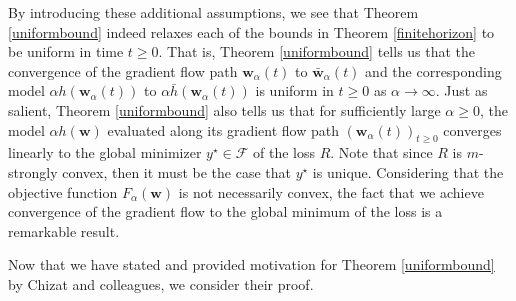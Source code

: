 \documentclass{article}
\begin{document}
By introducing these additional assumptions, we see that Theorem \ref{uniformbound} indeed relaxes each of the bounds in Theorem \ref{finitehorizon} to be uniform in time $t \geq 0$. That is, Theorem \ref{uniformbound} tells us that the convergence of the gradient flow path $\boldsymbol{w}_{\alpha}(t)$ to $\boldsymbol{\bar{w}}_{\alpha}(t)$ and the corresponding model $\alpha h(\boldsymbol{w}_{\alpha}(t))$ to $\alpha \bar{h}(\boldsymbol{w}_{\alpha}(t))$ is uniform in $t \geq 0$ as $\alpha \rightarrow \infty$. Just as salient, Theorem \ref{uniformbound} also tells us that for sufficiently large $\alpha \geq 0$, the model  $\alpha h(\boldsymbol{w})$ evaluated along its gradient flow path $(\boldsymbol{w}_{\alpha}(t))_{t \geq 0}$ converges linearly to the global minimizer $y^{\star} \in \mathcal{F}$ of the loss $R$. Note that since $R$ is $m$-strongly convex, then it must be the case that $y^{\star}$ is unique. Considering that the objective function $F_{\alpha}(\boldsymbol{w})$ is not necessarily convex, the fact that we achieve convergence of the gradient flow to the global minimum of the loss is a remarkable result.

Now that we have stated and provided motivation for Theorem \ref{uniformbound} by Chizat and colleagues, we consider their proof.
\end{document}
